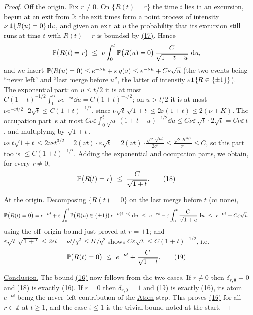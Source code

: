 \documentclass[11pt]{article}
\theoremstyle{plain}
\theoremstyle{definition}
\theoremstyle{remark}
\newcommand{\Z}{\mathbb{Z}}\newcommand{\R}{\mathbb{R}}\newcommand{\N}{\mathbb{N}}
\newcommand{\eps}{\varepsilon}\newcommand{\Exp}{\mathrm{Exp}}
\begin{document}
\begin{proof}
\underline{Off the origin.} Fix $r\ne0$. On $\{R(t)=r\}$ the time $t$ lies in an excursion,
begun at an exit from $0$; the exit times form a point process of intensity
$\nu\,\mathbf 1\{R(u)=0\}\,\mathrm{d} u$, and given an exit at $u$ the probability that its
excursion still runs at time $t$ with $R(t)=r$ is bounded by \hyperref[eq_killdom]{(17)}.
Hence
\[
  \PP\big(R(t)=r\big)\ \le\ \nu\int_0^t\PP\big(R(u)=0\big)\,
  \frac{C}{\sqrt{1+t-u}}\,\dd u,
\]
and we insert $\PP(R(u)=0)\le e^{-\nu u}+\eps\,g(u)\le e^{-\nu u}+C\eps\sqrt u$ (the
two events being ``never left'' and ``last merge before $u$'', the latter of
intensity $\eps\bone\{R\in\{\pm1\}\}$). The exponential part: on $u\le t/2$ it is at
most $C(1+t)^{-1/2}\int_0^\infty\nu e^{-\nu u}\dd u=C(1+t)^{-1/2}$; on $u>t/2$ it is
at most $\nu e^{-\nu t/2}\cdot2\sqrt t\le C(1+t)^{-1/2}$, since
$\nu\sqrt t\,\sqrt{1+t}\le2\nu(1+t)\le2(\nu+K)$. The occupation part is at most
$C\nu\eps\int_0^t\sqrt u\,(1+t-u)^{-1/2}\dd u\le C\nu\eps\,\sqrt t\cdot2\sqrt t
=C\nu\eps\,t$, and multiplying by $\sqrt{1+t}$,
$\nu\eps\,t\sqrt{1+t}\le2\nu\eps t^{3/2}=2(\nu t)\cdot\eps\sqrt t
=2(\nu t)\cdot\frac{\sqrt\nu\,\sqrt{\nu t}}{2q^2}\le\frac{\sqrt2\,K^{3/2}}{q^2}\le C$,
so this part too is $\le C(1+t)^{-1/2}$. Adding the exponential and occupation parts,
we obtain, for every $r\ne0$,
\label{eq_Roff}
\begin{equation}
  \PP\big(R(t)=r\big)\ \le\ \frac{C}{\sqrt{1+t}}.\qquad(18)
\end{equation}

\underline{At the origin.} Decomposing $\{R(t)=0\}$ on the last merge before $t$ (or none),
\[
  \PP\big(R(t)=0\big)=e^{-\nu t}
  +\eps\int_0^t\PP\big(R(u)\in\{\pm1\}\big)\,e^{-\nu(t-u)}\dd u
  \ \le\ e^{-\nu t}+\eps\int_0^t\frac{C}{\sqrt{1+u}}\dd u
  \ \le\ e^{-\nu t}+C\eps\sqrt t,
\]
using the off--origin bound just proved at $r=\pm1$; and
$\eps\sqrt t\,\sqrt{1+t}\le2\eps t=\nu t/q^2\le K/q^2$ shows
$C\eps\sqrt t\le C(1+t)^{-1/2}$, i.e.
\label{eq_Rzero}
\begin{equation}
  \mathbb{P}\big(R(t)=0\big)\ \le\ e^{-\nu t}+\frac{C}{\sqrt{1+t}}.\qquad(19)
\end{equation}

\underline{Conclusion.} The bound \hyperref[eq_Rbound]{(16)} now follows from the two cases. If
$r\ne0$ then $\delta_{r,0}=0$ and \hyperref[eq_Roff]{(18)} is exactly \hyperref[eq_Rbound]{(16)}. If
$r=0$ then $\delta_{r,0}=1$ and
\hyperref[eq_Rzero]{(19)} is exactly \hyperref[eq_Rbound]{(16)}, its atom $e^{-\nu t}$ being the
never--left contribution of the \underline{Atom} step. This proves \hyperref[eq_Rbound]{(16)}
for all $r\in\Z$ at $t\ge1$, and the case $t\le1$ is the trivial bound noted at the
start.
\end{proof}
\end{document}
